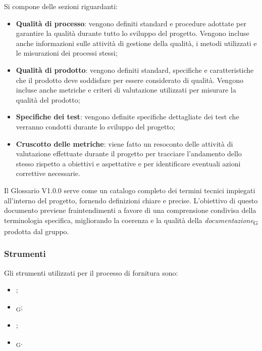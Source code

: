 Si compone delle sezioni riguardanti:
\begin{itemize}
    \item \textbf{Qualità di processo}: vengono definiti standard e procedure adottate per garantire la qualità durante tutto lo sviluppo del progetto. Vengono incluse anche informazioni sulle attività di gestione della qualità, i metodi utilizzati e le misurazioni dei processi stessi;
    \item \textbf{Qualità di prodotto}: vengono definiti standard, specifiche e caratteristiche che il prodotto deve soddisfare per essere considerato di qualità. Vengono incluse anche metriche e criteri di valutazione utilizzati per misurare la qualità del prodotto;
    \item \textbf{Specifiche dei test}: vengono definite specifiche dettagliate dei test che verranno condotti durante lo sviluppo del progetto;
    \item \textbf{Cruscotto delle metriche}: viene fatto un resoconto delle attività di valutazione effettuate durante il progetto per tracciare l'andamento dello stesso rispetto a obiettivi e aspettative e per identificare eventuali azioni correttive necessarie.
\end{itemize}

Il Glossario V1.0.0 serve come un catalogo completo dei termini tecnici impiegati all'interno del progetto, fornendo definizioni chiare e precise. L'obiettivo di questo documento previene fraintendimenti a favore di una comprensione condivisa della terminologia specifica, migliorando la coerenza e la qualità della \textit{documentazione}\textsubscript{G} prodotta dal gruppo.

\subsubsection{Strumenti}
Gli strumenti utilizzati per il processo di fornitura sono:
\begin{itemize}
    \item {};
    \item \textit{}\textsubscript{G};
    \item {};
    \item \textit{}\textsubscript{G}.
\end{itemize}